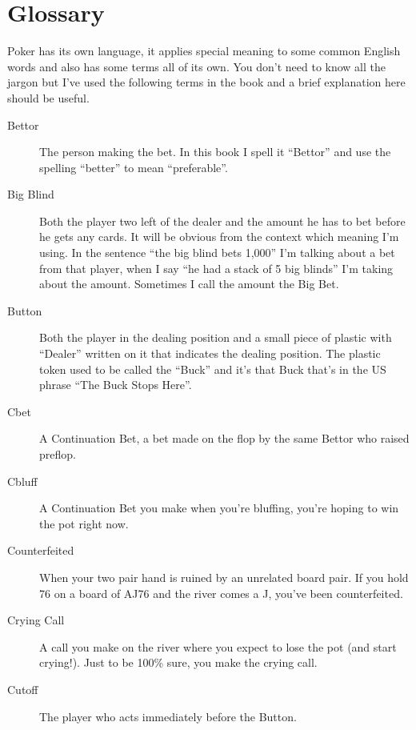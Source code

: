 \chapter{Glossary}


Poker has its own language, it applies special meaning to some
common English words and also has some terms all of its own. You
don't need to know all the jargon but I've used the following terms
in the book and a brief explanation here should be useful.

\begin{description}

\item[Bettor] The person making the bet. In this book I spell it ``Bettor''
and use the spelling ``better'' to mean ``preferable''.

\item[Big Blind] Both the player two left of the dealer and the amount
he has to bet before he gets any cards. It will be obvious from the context which
meaning I'm using. In the sentence ``the big blind bets 1,000'' I'm talking about a bet
from that player, when I say ``he had a stack of 5 big blinds'' I'm taking about the
amount. Sometimes I call the amount the Big Bet.

\item[Button] Both the player in the dealing position and a small piece
of plastic with ``Dealer'' written on it that indicates the dealing position.
The plastic token used to be called the ``Buck'' and it's that Buck that's in the
US phrase ``The Buck Stops Here''.

\item[Cbet] A Continuation Bet, a bet made on the flop by the same Bettor
who raised preflop.

\item[Cbluff] A Continuation Bet you make when you're bluffing, you're hoping
to win the pot right now.

\item[Counterfeited] When your two pair hand is ruined by an unrelated board pair.
If you hold 76 on a board of AJ76 and the river comes a J,
you've been counterfeited.

\item[Crying Call] A call you make on the river where you expect to lose the pot
(and start crying!). Just to be 100\% sure, you make the crying call.

\item[Cutoff] The player who acts immediately before the Button.


\end{description}
